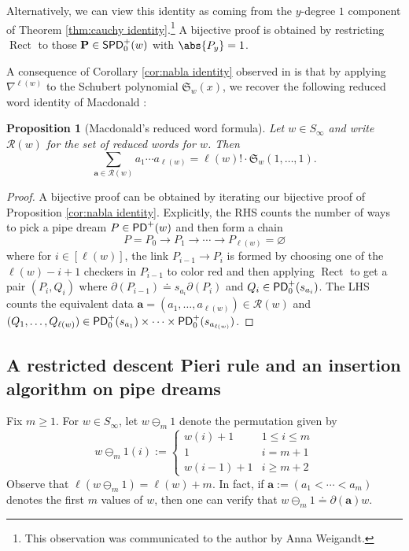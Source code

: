 \documentclass[11pt,reqno]{amsart} %
\newcommand{\frakS}{\mathfrak{S}}
\newcommand{\bfa}{\mathbf{a}}
\newcommand{\bfP}{\mathbf{P}}
\newcommand{\calR}{\mathcal{R}}
\DeclareMathOperator{\PD}{\sf{PD}}
\DeclareMathOperator{\SPD}{\sf{SPD}}
\DeclareMathOperator{\Rect}{Rect} %
\newtheorem{proposition}[theorem]{Proposition}
\theoremstyle{definition}
\begin{document}
\noindent
Alternatively, we can view this identity as coming from the $y$-degree $1$ component of Theorem \ref{thm:cauchy identity}.\footnote{
    This observation was communicated to the author by Anna Weigandt.
} A bijective proof is obtained by restricting $\Rect$ to those $\bfP\in \SPD^+_0(w)$ with $\abs{P_y} = 1$.

A consequence of Corollary \ref{cor:nabla identity} observed in \cite{HamakerPechenikSpeyerWeigandt20} is that by applying $\nabla^{\ell(w)}$ to the Schubert polynomial $\frakS_w(x)$, we recover the following reduced word identity of Macdonald \cite{Macdonald91}:

\begin{proposition}[Macdonald's reduced word formula]
\label{prop:macdonald formula}
Let $w\in S_\infty$ and write $\calR(w)$ for the set of reduced words for $w$.
Then \[
    \sum_{\mathbf{a} \in \calR(w)} a_1\cdots a_{\ell(w)}
    = \ell(w)! \cdot \frakS_w(1,\dots,1).
\]
\end{proposition}

\begin{proof}
A bijective proof can be obtained by iterating our bijective proof of Proposition \ref{cor:nabla identity}.
Explicitly, the RHS counts the number of ways to pick a pipe dream $P\in \PD^+(w)$ and then form a chain \[
    P = P_0\to P_1\to \cdots\to P_{\ell(w)} = \varnothing
\] where for $i\in [\ell(w)]$, the link $P_{i-1}\to P_i$ is formed by choosing one of the $\ell(w)-i+1$ checkers in $P_{i-1}$ to color red and then applying $\Rect$ to get a pair $(P_i,Q_i)$ where $\partial(P_{i-1}) \doteq s_{a_i}\partial(P_i)$ and $Q_i\in \PD^+_0(s_{a_i})$.
The LHS counts the equivalent data $\bfa = (a_1,\dots,a_{\ell(w)}) \in \calR(w)$ and $(Q_1,\dots,Q_{\ell(w)}) \in \PD^+_0(s_{a_1})\times\cdots\times \PD^+_0(s_{a_{\ell(w)}})$.
\end{proof}



\subsection{A restricted descent Pieri rule and an insertion algorithm on pipe dreams}
\label{subsect:pieri rule}

Fix $m\geq 1$.
For $w\in S_\infty$, let $w\ominus_m 1$ denote the permutation given by \[
   w\ominus_m 1(i) := \begin{cases}
        w(i)+1   & 1 \leq i \leq m \\
        1        & i = m+1 \\
        w(i-1)+1 & i \geq m+2
   \end{cases}
\]
Observe that $\ell(w\ominus_m 1) = \ell(w) + m$.
In fact, if $\bfa := (a_1<\cdots<a_m)$ denotes the first $m$ values of $w$, then one can verify that $w\ominus_m 1 \doteq \partial(\bfa)w$.
\end{document}
